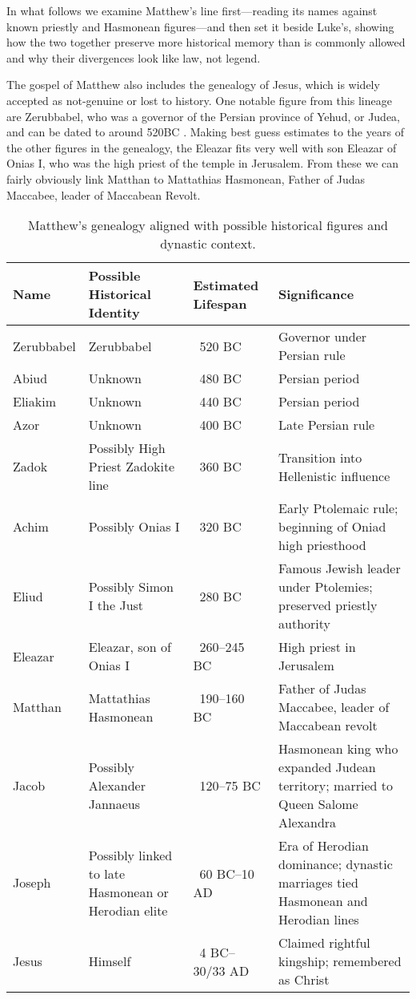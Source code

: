 In what follows we examine Matthew’s line first—reading its names against known priestly and Hasmonean figures—and then set it beside Luke’s, showing how the two together preserve more historical memory than is commonly allowed and why their divergences look like law, not legend.

The gospel of Matthew also includes the genealogy of Jesus, which is widely accepted as not-genuine or lost to history.
One notable figure from this lineage are Zerubbabel, who was a governor of the Persian province of Yehud, or Judea, and can be dated to around 520BC .
Making best guess estimates to the years of the other figures in the genealogy, the Eleazar fits very well with son Eleazar of Onias I, who was the high priest of the temple in Jerusalem.
From these we can fairly obviously link Matthan to Mattathias Hasmonean, Father of Judas Maccabee, leader of Maccabean Revolt.

\begin{table}[h]
    \centering
    \begin{tabular}{|l|p{3cm}|p{2.5cm}|p{4.5cm}|}
        \hline
        \textbf{Name} & \textbf{Possible Historical Identity} & \textbf{Estimated Lifespan} & \textbf{Significance} \\ \hline
        Zerubbabel & Zerubbabel & ~520 BC & Governor under Persian rule \\ \hline
        Abiud & Unknown & ~480 BC & Persian period \\ \hline
        Eliakim & Unknown & ~440 BC & Persian period \\ \hline
        Azor & Unknown & ~400 BC & Late Persian rule \\ \hline
        Zadok & Possibly High Priest Zadokite line & ~360 BC & Transition into Hellenistic influence \\ \hline
        Achim & Possibly Onias I & ~320 BC & Early Ptolemaic rule; beginning of Oniad high priesthood \\ \hline
        Eliud & Possibly Simon I the Just & ~280 BC & Famous Jewish leader under Ptolemies; preserved priestly authority \\ \hline
        Eleazar & Eleazar, son of Onias I & ~260–245 BC & High priest in Jerusalem \\ \hline
        Matthan & Mattathias Hasmonean & ~190–160 BC & Father of Judas Maccabee, leader of Maccabean revolt \\ \hline
        Jacob & Possibly Alexander Jannaeus & ~120–75 BC & Hasmonean king who expanded Judean territory; married to Queen Salome Alexandra \\ \hline
        Joseph & Possibly linked to late Hasmonean or Herodian elite & ~60 BC–10 AD & Era of Herodian dominance; dynastic marriages tied Hasmonean and Herodian lines \\ \hline
        Jesus & Himself & ~4 BC–30/33 AD & Claimed rightful kingship; remembered as Christ \\ \hline
    \end{tabular}
    \caption{Matthew’s genealogy aligned with possible historical figures and dynastic context.}\label{tab:table}
\end{table}

